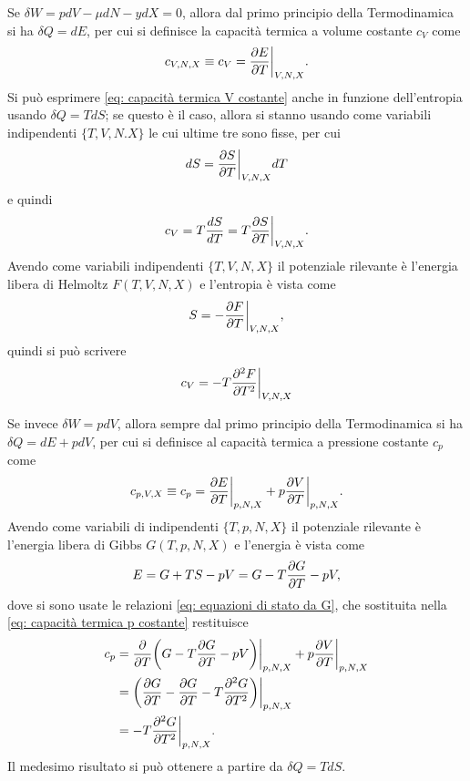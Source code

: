 Se $\delta W = pdV - \mu dN - ydX  = 0$, allora dal primo principio della Termodinamica si ha $\delta Q = dE$, per cui si definisce la capacità termica a volume costante $c_V$ come
\begin{equation}
\label{eq: capacità termica V costante}
    c_{V,N,X} \equiv c_V = \frac{\partial E}{\partial T}\bigg|_{V,N,X}.
\end{equation}
Si può esprimere \eqref{eq: capacità termica V costante} anche in funzione dell'entropia usando $\delta Q = TdS$; se questo è il caso, allora si stanno usando come variabili indipendenti $\{T,V,N.X\}$ le cui ultime tre sono fisse, per cui 
\begin{equation}
    dS = \frac{\partial S}{\partial T}\bigg|_{V,N,X}dT
\end{equation}
e quindi
\begin{equation}
    c_V = T\frac{dS}{dT} = T\frac{\partial S}{\partial T}\bigg|_{V,N,X}.
\end{equation}
Avendo come variabili indipendenti $\{T,V,N,X\}$ il potenziale rilevante è l'energia libera di Helmoltz $F(T,V,N,X)$ e l'entropia è vista come
\begin{equation}
    S = -\frac{\partial F}{\partial T}\bigg|_{V,N,X},
\end{equation}
quindi si può scrivere
\begin{equation}
    c_V = -T\frac{\partial^2F}{\partial T^2}\bigg|_{V,N,X}
\end{equation}

Se invece $\delta W = pdV$, allora sempre dal primo principio della Termodinamica si ha $\delta Q = dE + pdV$, per cui si definisce al capacità termica a pressione costante $c_p$ come 
\begin{equation}
\label{eq: capacità termica p costante}
    c_{p,V,X} \equiv c_p = \frac{\partial E}{\partial T}\bigg|_{p,N,X} + p\frac{\partial V}{\partial T}\bigg|_{p,N,X}.
\end{equation}
Avendo come variabili di indipendenti $\{T,p,N,X\}$ il potenziale rilevante è l'energia libera di Gibbs $G(T,p,N,X)$ e l'energia è vista come
\begin{equation}
    E = G + TS -pV = G - T\frac{\partial G}{\partial T} - pV,
\end{equation}
dove si sono usate le relazioni \eqref{eq: equazioni di stato da G}, che sostituita nella \eqref{eq: capacità termica p costante} restituisce
\begin{equation}
    \begin{split}
        c_p &= \frac{\partial}{\partial T}\bigg(G - T\frac{\partial G}{\partial T} - pV\bigg)\bigg|_{p,N,X} + p\frac{\partial V}{\partial T}\bigg|_{p,N,X} \\
        &=\bigg(\frac{\partial G}{\partial T} - \frac{\partial G}{\partial T} -T\frac{\partial^2G}{\partial T^2}\bigg)\bigg|_{p,N,X} \\
        &=-T\frac{\partial^2 G}{\partial T^2}\bigg|_{p,N,X}.
    \end{split}
\end{equation}
Il medesimo risultato si può ottenere a partire da $\delta Q = TdS$.

